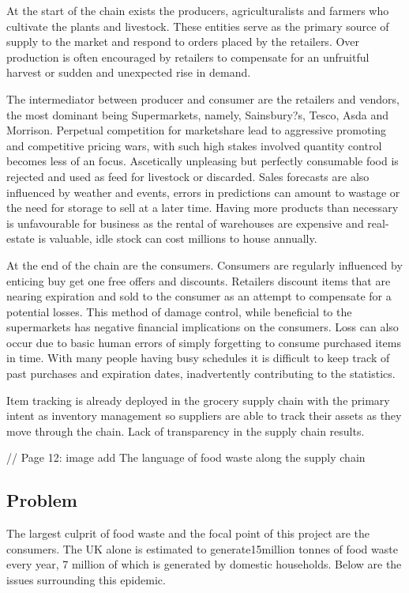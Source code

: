 \documentclass[a4paper, 11pt]{article}
\begin{document}
At the start of the chain exists the producers, agriculturalists and farmers who cultivate the plants and livestock. These entities serve as the primary source of supply to the market and respond to orders placed by the retailers. Over production is often encouraged by retailers to compensate for an unfruitful harvest or sudden and unexpected rise in demand. 

The intermediator between producer and consumer are the retailers and vendors, the most dominant being Supermarkets, namely, Sainsbury?s, Tesco, Asda and Morrison. Perpetual competition for marketshare lead to aggressive promoting and competitive pricing wars, with such high stakes involved quantity control becomes less of an focus. Ascetically unpleasing but perfectly consumable food is rejected and used as feed for livestock or discarded. Sales forecasts are also influenced by weather and events, errors in predictions can amount to wastage or the need for storage to sell at a later time. Having more products than necessary is unfavourable for business as the rental of warehouses are expensive and real-estate is valuable, idle stock can cost millions to house annually.

At the end of the chain are the consumers. Consumers are regularly influenced by enticing buy get one free offers and discounts. Retailers discount items that are nearing expiration and sold to the consumer as an attempt to compensate for a potential losses. This method of damage control, while beneficial to the supermarkets has negative financial implications on the consumers. Loss can also occur due to basic human errors of simply forgetting to consume purchased items in time. With many people having busy schedules it is difficult to keep track of past purchases and expiration dates, inadvertently contributing to the statistics.

Item tracking is already deployed in the grocery supply chain with the primary intent as inventory management so suppliers are able to track their assets as they move through the chain. Lack of transparency in the supply chain results.
\vspace{\baselineskip}

// Page 12: image add The language of food waste along the supply chain 
\vspace{\baselineskip}
\vspace{\baselineskip}
\vspace{\baselineskip}

\subsection{Problem}
The largest culprit of food waste and the focal point of this project are the consumers. The UK alone is estimated to generate15million tonnes of food waste every year, 7 million of which is generated by domestic households. Below are the issues surrounding this epidemic. 
\end{document}
